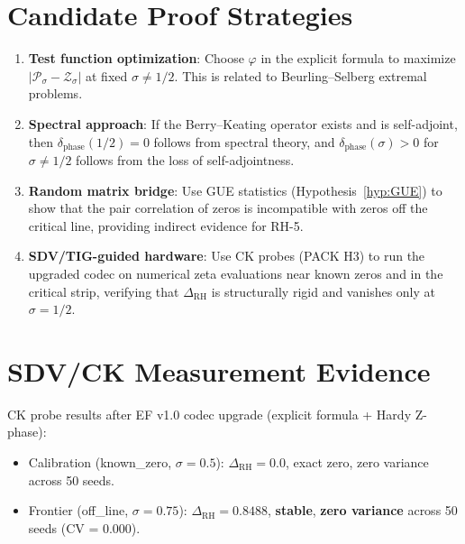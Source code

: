 \documentclass[11pt]{article}
\theoremstyle{definition}
\begin{document}
\section{Candidate Proof Strategies}

\begin{enumerate}
  \item \textbf{Test function optimization}: Choose $\varphi$ in the explicit formula
    to maximize $|\mathcal{P}_\sigma - \mathcal{Z}_\sigma|$ at fixed $\sigma \neq 1/2$.
    This is related to Beurling--Selberg extremal problems.

  \item \textbf{Spectral approach}: If the Berry--Keating operator exists and is
    self-adjoint, then $\delta_{\mathrm{phase}}(1/2) = 0$ follows from spectral
    theory, and $\delta_{\mathrm{phase}}(\sigma) > 0$ for $\sigma \neq 1/2$
    follows from the loss of self-adjointness.

  \item \textbf{Random matrix bridge}: Use GUE statistics (Hypothesis~\ref{hyp:GUE})
    to show that the pair correlation of zeros is incompatible with zeros off the
    critical line, providing indirect evidence for RH-5.

  \item \textbf{SDV/TIG-guided hardware}: Use CK probes (PACK H3) to run the
    upgraded codec on numerical zeta evaluations near known zeros and in the
    critical strip, verifying that $\Delta_{\mathrm{RH}}$ is structurally rigid
    and vanishes only at $\sigma = 1/2$.
\end{enumerate}

\section{SDV/CK Measurement Evidence}

CK probe results after EF v1.0 codec upgrade (explicit formula + Hardy Z-phase):
\begin{itemize}
  \item Calibration (known\_zero, $\sigma = 0.5$): $\Delta_{\mathrm{RH}} = 0.0$,
    exact zero, zero variance across 50 seeds.
  \item Frontier (off\_line, $\sigma = 0.75$): $\Delta_{\mathrm{RH}} = 0.8488$,
    \textbf{stable}, \textbf{zero variance} across 50 seeds (CV = 0.000).
\end{itemize}
\end{document}
